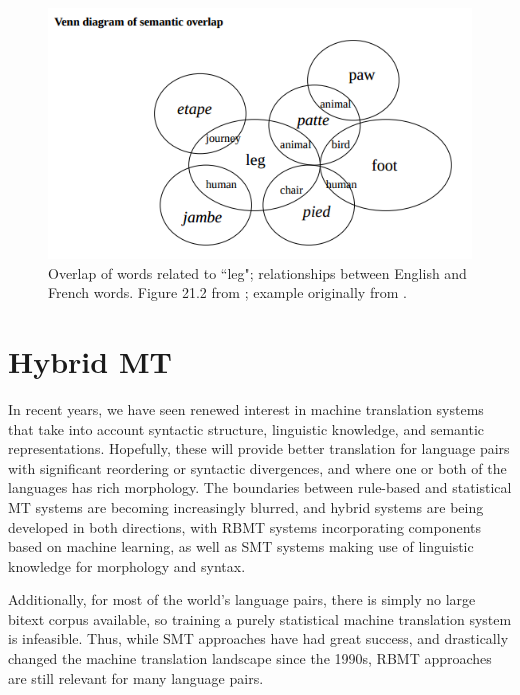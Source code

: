 \begin{figure}
  \includegraphics[width=12cm]{hutchins-leg-etc.png}
  \caption{Overlap of words related to ``leg"; relationships between English
  and French words. Figure 21.2 from \protect\cite{slp1}; example originally
  from \protect\cite[Chapter 6]{hutchins1992introduction}.}
  \label{fig:leg}
\end{figure}









\section{Hybrid MT}

In recent years, we have seen renewed interest in machine translation systems
that take into account syntactic structure, linguistic knowledge, and semantic
representations.
Hopefully, these will provide better translation for language pairs with
significant reordering or syntactic divergences, and where one or both of the
languages has rich morphology.
The boundaries between rule-based and statistical MT systems are becoming
increasingly blurred, and hybrid systems are being developed in both
directions, with RBMT systems incorporating components based on machine
learning, as well as SMT systems making use of linguistic knowledge for
morphology and syntax.

Additionally, for most of the world's language pairs, there is simply no large
bitext corpus available, so training a purely statistical machine translation
system is infeasible.
Thus, while SMT approaches have had great success, and drastically changed the
machine translation landscape since the 1990s, RBMT approaches are still
relevant for many language pairs.

